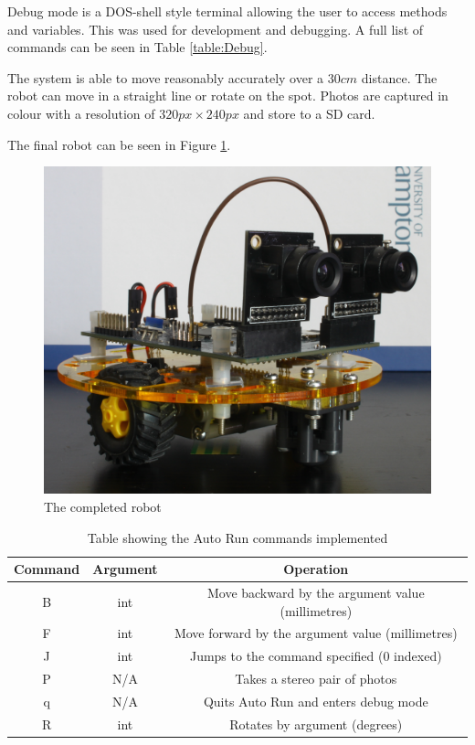 Debug mode is a DOS-shell style terminal allowing the user to access methods and variables. This was used for development and debugging. A full list of commands can be seen in Table \ref{table:Debug}. 

The system is able to move reasonably accurately over a $30cm$ distance. The robot can move in a straight line or rotate on the spot. Photos are captured in colour with a resolution of $320px \times 240px$ and store to a SD card. 

The final robot can be seen in Figure \ref{fig:Robot:Complete}.

\begin{figure}
\includegraphics[width=\textwidth]{Figures/Robot.jpg}
\caption{The completed robot}
\label{fig:Robot:Complete}
\end{figure}

\begin{table}
\centering
\caption{Table showing the Auto Run commands implemented}
\label{table:AutoRun}
\begin{tabular}{ccc}\toprule
\textbf{Command} & 	\textbf{Argument} 			& 	\textbf{Operation} \\\toprule
B		&	int					&	Move backward by the argument value (millimetres) \\\midrule
F		&	int 				&	Move forward by the argument value (millimetres)\\\midrule
J		&	int					&	Jumps to the command specified (0 indexed)\\\midrule
P		&	N/A					&	Takes a stereo pair of photos\\\midrule
q		&	N/A					&	Quits Auto Run and enters debug mode\\\midrule
R		& 	int 			 	&	Rotates by argument (degrees)\\ \bottomrule
\end{tabular}
\end{table}

